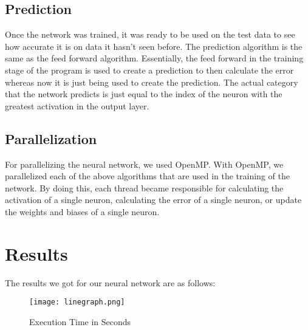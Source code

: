 \documentclass[twoside,twocolumn]{article}
\begin{document}
\subsection{Prediction}
Once the network was trained, it was ready to be used on the test data to see how accurate it is on data it hasn't seen before. The prediction algorithm is the same as the feed forward algorithm. Essentially, the feed forward in the training stage of the program is used to create a prediction to then calculate the error whereas now it is just being used to create the prediction. The actual category that the network predicts is just equal to the index of the neuron with the greatest activation in the output layer. \\

\subsection{Parallelization}
For parallelizing the neural network, we used OpenMP. With OpenMP, we parallelized each of the above algorithms that are used in the training of the network. By doing this, each thread became responsible for calculating the activation of a single neuron, calculating the error of a single neuron, or update the weights and biases of a single neuron. 
\section{Results}
The results we got for our neural network are as follows:\\
\begin{figure}[h]
    \centering
    \texttt{[image: linegraph.png]}
    \caption{Execution Time in Seconds}
\end{figure}
\end{document}
